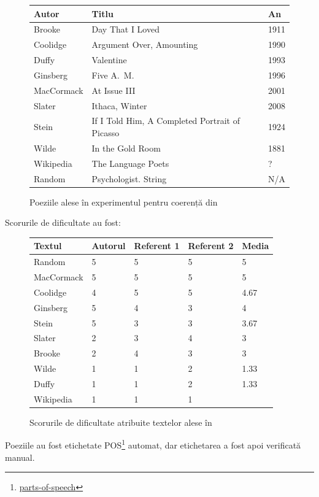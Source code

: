 \begin{figure}[!htb]
  \centering
  \begin{tabular}{l|l|l}
    Autor & Titlu & An \\
    \hline
    Brooke & Day That I Loved & 1911 \\
    Coolidge & Argument Over, Amounting & 1990 \\
    Duffy & Valentine & 1993 \\
    Ginsberg & Five A.\ M.\ & 1996 \\
    MacCormack & At Issue III & 2001 \\
    Slater & Ithaca, Winter & 2008 \\
    Stein & If I Told Him, \newline A Completed Portrait of Picasso & 1924 \\
    Wilde & In the Gold Room & 1881 \\
    Wikipedia & The Language Poets & ? \\
    Random & Psychologist. String & N/A
  \end{tabular}
  \caption{Poeziile alese în experimentul pentru coerență din \cite{herbelot}}
  \label{fig:tab-poezii}
\end{figure}

Scorurile de dificultate au fost:

\begin{figure}[!htb]
  \centering
  \begin{tabular}{l|l|l|l|l}
    Textul & Autorul & Referent 1 & Referent 2 & Media \\
    \hline
    Random & 5 & 5 & 5 & 5 \\
    MacCormack & 5 & 5 & 5 & 5 \\
    Coolidge & 4 & 5 & 5 & 4.67 \\
    Ginsberg & 5 & 4 & 3 & 4 \\
    Stein & 5 & 3 & 3 & 3.67 \\
    Slater & 2 & 3 & 4 & 3 \\
    Brooke & 2 & 4 & 3 & 3 \\
    Wilde & 1 & 1 & 2 & 1.33 \\
    Duffy & 1 & 1 & 2 & 1.33 \\
    Wikipedia & 1 & 1 & 1 
  \end{tabular}
  \caption{Scorurile de dificultate atribuite textelor alese în \cite{herbelot}}
\end{figure}

Poeziile au fost etichetate POS\footnote{\href{https://en.wikipedia.org/wiki/Part-of-speech\_tagging}{parts-of-speech}}
automat, dar etichetarea a fost apoi verificată manual.


